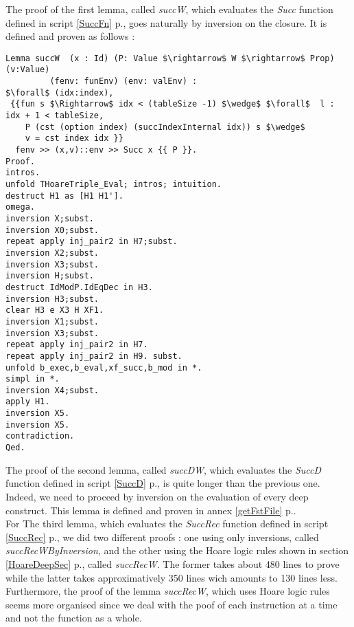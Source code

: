 The proof of the first lemma, called \textit{succW}, which evaluates the \textit{Succ} function defined in script \ref{SuccFn} p.\pageref{SuccFn}, goes naturally by inversion on the closure. It is defined and proven as follows :
\begin{lstlisting}[caption = {succW Lemma definition and proof}, xleftmargin=-.05\textwidth,
xrightmargin=-.05\textwidth,mathescape=true]
Lemma succW  (x : Id) (P: Value $\rightarrow$ W $\rightarrow$ Prop) (v:Value) 
	     (fenv: funEnv) (env: valEnv) :
$\forall$ (idx:index),
 {{fun s $\Rightarrow$ idx < (tableSize -1) $\wedge$ $\forall$  l : idx + 1 < tableSize, 
    P (cst (option index) (succIndexInternal idx)) s $\wedge$
    v = cst index idx }}  
  fenv >> (x,v)::env >> Succ x {{ P }}.
Proof.
intros.
unfold THoareTriple_Eval; intros; intuition.
destruct H1 as [H1 H1'].
omega.
inversion X;subst.
inversion X0;subst.
repeat apply inj_pair2 in H7;subst.
inversion X2;subst.
inversion X3;subst.
inversion H;subst.
destruct IdModP.IdEqDec in H3.
inversion H3;subst.
clear H3 e X3 H XF1.
inversion X1;subst.
inversion X3;subst.
repeat apply inj_pair2 in H7.
repeat apply inj_pair2 in H9. subst.
unfold b_exec,b_eval,xf_succ,b_mod in *.
simpl in *.
inversion X4;subst.
apply H1.
inversion X5.
inversion X5.
contradiction.
Qed.
\end{lstlisting} \vspace{4pt}

The proof of the second lemma, called \textit{succDW}, which evaluates the \textit{SuccD} function defined in script \ref{SuccD} p.\pageref{SuccD}, is quite longer than the previous one. Indeed, we need to proceed by inversion on the evaluation of every deep construct. This lemma is defined and proven in annex \ref{getFstFile} p.\pageref{getFstFile}.  \\  

For The third lemma, which evaluates the \textit{SuccRec} function defined in script \ref{SuccRec} p.\pageref{SuccRec}, we did two different proofs : one using only inversions, called \textit{succRecWByInversion}, and the other using the Hoare logic rules shown in section \ref{HoareDeepSec} p.\pageref{HoareDeepSec}, called \textit{succRecW}. The former takes about 480 lines to prove while the latter takes approximatively 350 lines wich amounts to 130 lines less. Furthermore, the proof of the lemma \textit{succRecW}, which uses Hoare logic rules seems more organised since we deal with the poof of each instruction at a time and not the function as a whole.\\


